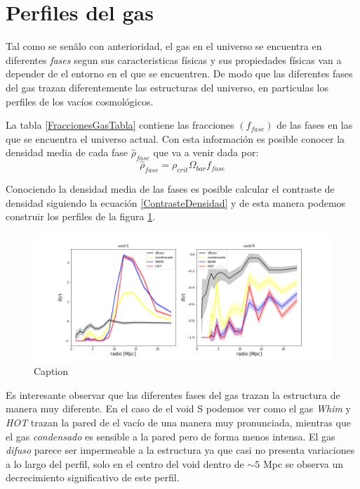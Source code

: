 \section{Perfiles del gas}

Tal como se sen\~alo con anterioridad, el gas en el universo se encuentra en diferentes \textit{fases} segun sus caracteristicas f\'isicas y sus propiedades f\'isicas van a depender de el entorno en el que se encuentren. De modo que las diferentes fases del gas trazan diferentemente las estructuras del universo, en particulas los perfiles de los vac\'ios cosmol\'ogicos. 

La tabla \ref{FraccionesGasTabla} contiene las fracciones $(f_{fase})$ de las fases en las que se encuentra el universo actual. Con esta informaci\'on es posible conocer la densidad media de cada fase $\hat{\rho}_{fase}$ que va a venir dada por:
\begin{equation}
    \hat{\rho}_{fase}=\rho_{crit}\Omega_{bar}f_{fase}
\end{equation}{}

Conociendo la densidad media de las fases es posible calcular el contraste de densidad siguiendo la ecuaci\'on \ref{ContrasteDensidad} y de esta manera podemos construir los perfiles de la figura \ref{PerfilGas}.


\begin{figure}
    \centering
    \includegraphics[width=14cm]{Figures/perfilgas.png}
    \caption{Caption}
    \label{PerfilGas}
\end{figure}{}

Es interesante observar que las diferentes fases del gas trazan la estructura de manera muy diferente. En el caso de el void S podemos ver como el gas \textit{Whim} y \textit{HOT} trazan la pared de el vac\'io de una manera muy pronunciada, mientras que el gas \textit{condensado} es sensible a la pared pero de forma menos intensa. El gas \textit{difuso} parece ser impermeable a la estructura ya que casi no presenta variaciones a lo largo del perfil, solo en el centro del void dentro de $\sim 5$ Mpc se observa un decrecimiento significativo de este perfil. 

